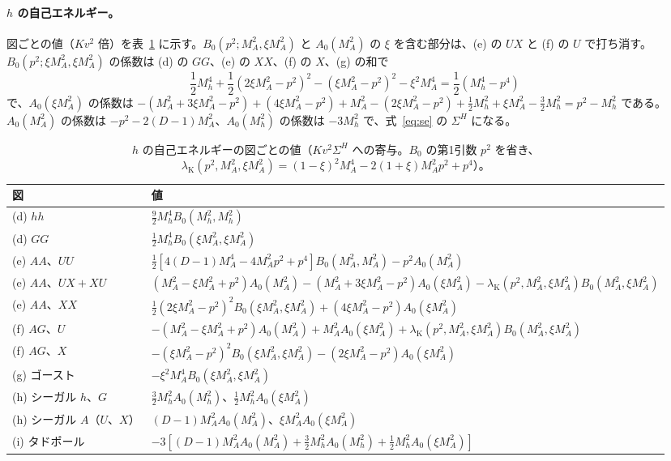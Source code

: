 \documentclass[a4paper,10pt]{ltjsarticle}
\newcommand{\lK}{\lambda_{\mathrm K}}
\begin{document}
\paragraph{$h$ の自己エネルギー。}図ごとの値（$Kv^2$ 倍）を表~\ref{tab:seh} に示す。$B_0(p^2;M_A^2,\xi M_A^2)$ と $A_0(M_A^2)$ の $\xi$ を含む部分は、(e) の $UX$ と (f) の $U$ で打ち消す。$B_0(p^2;\xi M_A^2,\xi M_A^2)$ の係数は (d) の $GG$、(e) の $XX$、(f) の $X$、(g) の和で
\begin{equation*}
\frac12M_h^4+\frac12(2\xi M_A^2-p^2)^2-(\xi M_A^2-p^2)^2-\xi^2M_A^4=\frac12(M_h^4-p^4)
\end{equation*}
で、$A_0(\xi M_A^2)$ の係数は $-(M_A^2+3\xi M_A^2-p^2)+(4\xi M_A^2-p^2)+M_A^2-(2\xi M_A^2-p^2)+\frac12M_h^2+\xi M_A^2-\frac32M_h^2=p^2-M_h^2$ である。$A_0(M_A^2)$ の係数は $-p^2-2(D-1)M_A^2$、$A_0(M_h^2)$ の係数は $-3M_h^2$ で、式~\eqref{eq:se} の $\Sigma^H$ になる。

\begin{table}[tbp]
\centering\small
\caption{$h$ の自己エネルギーの図ごとの値（$Kv^2\Sigma^H$ への寄与。$B_0$ の第1引数 $p^2$ を省き、$\lK(p^2,M_A^2,\xi M_A^2)=(1-\xi)^2M_A^4-2(1+\xi)M_A^2p^2+p^4$）。}
\label{tab:seh}
\begin{tabularx}{\linewidth}{>{\raggedright\arraybackslash}p{3.3cm}X}
\toprule
図 & 値 \\
\midrule
(d) $hh$ & $\frac92M_h^4B_0(M_h^2,M_h^2)$ \\
(d) $GG$ & $\frac12M_h^4B_0(\xi M_A^2,\xi M_A^2)$ \\
(e) $AA$、$UU$ & $\frac12[4(D-1)M_A^4-4M_A^2p^2+p^4]B_0(M_A^2,M_A^2)-p^2A_0(M_A^2)$ \\
(e) $AA$、$UX+XU$ & $(M_A^2-\xi M_A^2+p^2)A_0(M_A^2)-(M_A^2+3\xi M_A^2-p^2)A_0(\xi M_A^2)-\lK(p^2,M_A^2,\xi M_A^2)B_0(M_A^2,\xi M_A^2)$ \\
(e) $AA$、$XX$ & $\frac12(2\xi M_A^2-p^2)^2B_0(\xi M_A^2,\xi M_A^2)+(4\xi M_A^2-p^2)A_0(\xi M_A^2)$ \\
(f) $AG$、$U$ & $-(M_A^2-\xi M_A^2+p^2)A_0(M_A^2)+M_A^2A_0(\xi M_A^2)+\lK(p^2,M_A^2,\xi M_A^2)B_0(M_A^2,\xi M_A^2)$ \\
(f) $AG$、$X$ & $-(\xi M_A^2-p^2)^2B_0(\xi M_A^2,\xi M_A^2)-(2\xi M_A^2-p^2)A_0(\xi M_A^2)$ \\
(g) ゴースト & $-\xi^2M_A^4B_0(\xi M_A^2,\xi M_A^2)$ \\
(h) シーガル $h$、$G$ & $\frac32M_h^2A_0(M_h^2)$、$\frac12M_h^2A_0(\xi M_A^2)$ \\
(h) シーガル $A$（$U$、$X$） & $(D-1)M_A^2A_0(M_A^2)$、$\xi M_A^2A_0(\xi M_A^2)$ \\
(i) タドポール & $-3[(D-1)M_A^2A_0(M_A^2)+\frac32M_h^2A_0(M_h^2)+\frac12M_h^2A_0(\xi M_A^2)]$ \\
\bottomrule
\end{tabularx}
\end{table}
\end{document}
